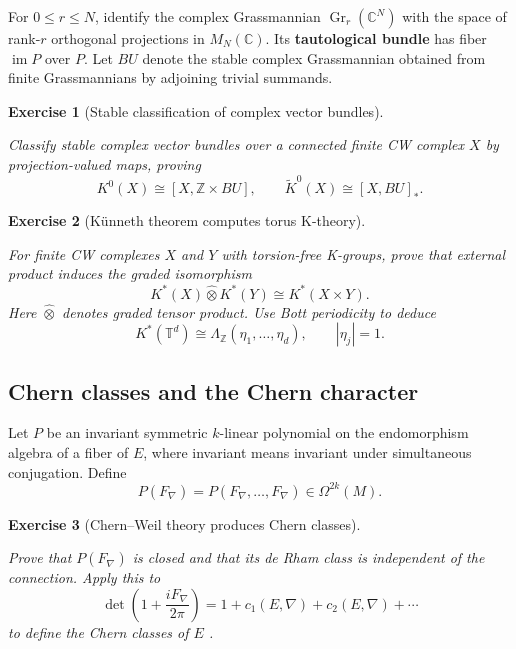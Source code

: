 \documentclass{article}
\newtheorem{exercise}{Exercise}
\begin{document}
For $0\leq r\leq N$, identify the complex Grassmannian $\operatorname{Gr}_r(\mathbb C^N)$ with the space of rank-$r$ orthogonal projections in $M_N(\mathbb C)$. Its \textbf{tautological bundle} has fiber $\operatorname{im}P$ over $P$. Let $BU$ denote the stable complex Grassmannian obtained from finite Grassmannians by adjoining trivial summands.

\begin{exercise}[Stable classification of complex vector bundles]\label{ex:stable-bundle-classification}\leavevmode\par
\textit{Classify stable complex vector bundles over a connected finite CW
complex $X$ by projection-valued maps, proving}
\[
K^0(X)\cong[X,\mathbb Z\times BU],
\qquad
\widetilde K^0(X)\cong[X,BU]_*.
\]
\end{exercise}

\begin{exercise}[K\"unneth theorem computes torus K-theory]
\label{ex:kunneth-k-theory}\leavevmode\par
\textit{For finite CW complexes $X$ and $Y$ with torsion-free K-groups,
prove that external product induces the graded isomorphism} \cite{atiyah-k-theory}
\[
K^*(X)\mathbin{\widehat\otimes}K^*(Y)
\cong K^*(X\times Y).
\]
\textit{Here $\widehat\otimes$ denotes graded tensor product. Use Bott
periodicity to deduce}
\[
K^*(\mathbb T^d)
\cong\Lambda_{\mathbb Z}(\eta_1,\ldots,\eta_d),
\qquad |\eta_j|=1.
\]
\end{exercise}

\subsection{Chern classes and the Chern character}

Let $P$ be an invariant symmetric $k$-linear polynomial on the endomorphism
algebra of a fiber of $E$, where invariant means invariant under simultaneous
conjugation. Define
\[
P(F_\nabla)
=P(F_\nabla,\ldots,F_\nabla)
\in\Omega^{2k}(M).
\]

\begin{exercise}[Chern--Weil theory produces Chern classes]
\label{ex:chern-weil}\leavevmode\par
\textit{Prove that $P(F_\nabla)$ is closed and that its de Rham class is
independent of the connection. Apply this to}
\[
\det\left(1+\frac{iF_\nabla}{2\pi}\right)
=1+c_1(E,\nabla)+c_2(E,\nabla)+\cdots
\]
\textit{to define the Chern classes of $E$} \cite{chern-simons}.
\end{exercise}
\end{document}
